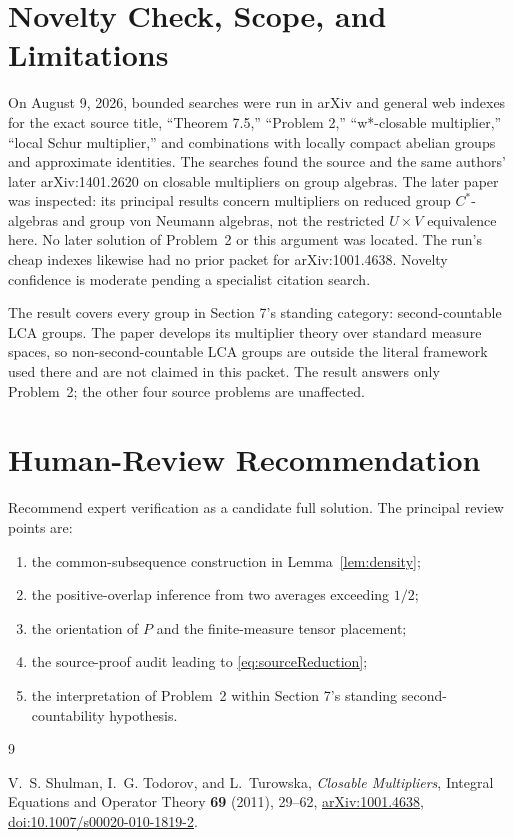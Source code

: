 \documentclass[11pt]{article}
\begin{document}
\section*{Novelty Check, Scope, and Limitations}

On August 9, 2026, bounded searches were run in arXiv and general web
indexes for the exact source title, ``Theorem 7.5,'' ``Problem 2,''
``w*-closable multiplier,'' ``local Schur multiplier,'' and combinations
with locally compact abelian groups and approximate identities.  The searches
found the source and the same authors' later arXiv:1401.2620 on closable
multipliers on group algebras.  The later paper was inspected: its principal
results concern multipliers on reduced group \(C^*\)-algebras and group von
Neumann algebras, not the restricted \(U\times V\) equivalence here.  No
later solution of Problem~2 or this argument was located.  The run's cheap
indexes likewise had no prior packet for arXiv:1001.4638.  Novelty confidence
is moderate pending a specialist citation search.

The result covers every group in Section 7's standing category:
second-countable LCA groups.  The paper develops its multiplier theory over
standard measure spaces, so non-second-countable LCA groups are outside the
literal framework used there and are not claimed in this packet.  The result
answers only Problem~2; the other four source problems are unaffected.

\section*{Human-Review Recommendation}

Recommend expert verification as a candidate full solution.  The principal
review points are:
\begin{enumerate}
\item the common-subsequence construction in Lemma~\ref{lem:density};
\item the positive-overlap inference from two averages exceeding \(1/2\);
\item the orientation of \(P\) and the finite-measure tensor placement;
\item the source-proof audit leading to \eqref{eq:sourceReduction};
\item the interpretation of Problem~2 within Section 7's standing
second-countability hypothesis.
\end{enumerate}

\begin{thebibliography}{9}

V.~S. Shulman, I.~G. Todorov, and L.~Turowska,
\emph{Closable Multipliers},
Integral Equations and Operator Theory \textbf{69} (2011), 29--62,
\href{https://arxiv.org/abs/1001.4638}{arXiv:1001.4638},
\href{https://doi.org/10.1007/s00020-010-1819-2}
{doi:10.1007/s00020-010-1819-2}.

\end{thebibliography}
\end{document}
